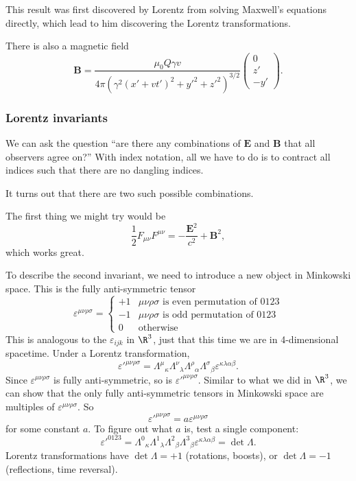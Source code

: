 \documentclass[a4paper]{article}
\begin{document}
\begin{eg}
  This result was first discovered by Lorentz from solving Maxwell's equations directly, which lead to him discovering the Lorentz transformations.

  There is also a magnetic field
  \[
    \mathbf{B} = \frac{\mu_0 Q\gamma v}{4\pi(\gamma^2(x' + vt')^2 + y'^2 + z'^2)^{3/2}}
    \begin{pmatrix}
      0\\z'\\-y'
    \end{pmatrix}.
  \]
\end{eg}

\subsubsection*{Lorentz invariants}
We can ask the question ``are there any combinations of $\mathbf{E}$ and $\mathbf{B}$ that all observers agree on?'' With index notation, all we have to do is to contract all indices such that there are no dangling indices.

It turns out that there are two such possible combinations.

The first thing we might try would be
\[
  \frac{1}{2}F_{\mu\nu}F^{\mu\nu} = -\frac{\mathbf{E}^2}{c^2} + \mathbf{B}^2,
\]
which works great.

To describe the second invariant, we need to introduce a new object in Minkowski space. This is the fully anti-symmetric tensor
\[
  \varepsilon^{\mu\nu\rho\sigma} =
  \begin{cases}
    +1 & \mu\nu\rho\sigma\text{ is even permutation of 0123}\\
    -1 & \mu\nu\rho\sigma\text{ is odd permutation of 0123}\\
    0 & \text{otherwise}
  \end{cases}
\]
This is analogous to the $\varepsilon_{ijk}$ in $\R^3$, just that this time we are in 4-dimensional spacetime. Under a Lorentz transformation,
\[
  \varepsilon'^{\mu\nu\rho\sigma} = \Lambda^\mu\!_\kappa\Lambda^\nu\!_\lambda \Lambda^\rho\!_\alpha \Lambda^\sigma\!_\beta \varepsilon^{\kappa\lambda\alpha\beta}.
\]
Since $\varepsilon^{\mu\nu\rho\sigma}$ is fully anti-symmetric, so is $\varepsilon'^{\mu\nu\rho\sigma}$. Similar to what we did in $\R^3$, we can show that the only fully anti-symmetric tensors in Minkowski space are multiples of $\varepsilon^{\mu\nu\rho\sigma}$. So
\[
  \varepsilon'^{\mu\nu\rho\sigma} = a \varepsilon^{\mu\nu\rho\sigma}
\]
for some constant $a$. To figure out what $a$ is, test a single component:
\[
  \varepsilon'^{0123} = \Lambda^0\!_\kappa\Lambda^1\!_\lambda \Lambda^2\!_\beta \Lambda^3\!_\beta \varepsilon^{\kappa\lambda\alpha\beta} = \det \Lambda.
\]
Lorentz transformations have $\det \Lambda = +1$ (rotations, boosts), or $\det \Lambda = -1$ (reflections, time reversal).
\end{document}
